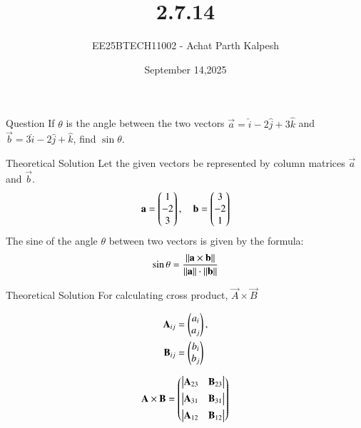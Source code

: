 \documentclass{beamer}
\title %
{2.7.14}
\date{September 14,2025}
\author %
{EE25BTECH11002 - Achat Parth Kalpesh}
\begin{document}
\frame{\titlepage}

\begin{frame}{Question}
If $\theta$ is the angle between the two vectors $\vec{a} = \hat{i} - 2\hat{j} + 3\hat{k}$ and $\vec{b} = 3\hat{i} - 2\hat{j} + \hat{k}$, find $\sin \theta$.
\end{frame}

\begin{frame}{Theoretical Solution}
Let the given vectors be represented by column matrices $\vec{a}$ and $\vec{b}$.
\begin{align}
    \mathbf{a} = \begin{pmatrix}1 \\ -2 \\ 3\end{pmatrix}, \quad \mathbf{b} = \begin{pmatrix}3 \\ -2 \\ 1\end{pmatrix}
\end{align}
The sine of the angle $\theta$ between two vectors is given by the formula:
\begin{align}
    \sin\theta = \frac{\left\lVert\mathbf{a} \times \mathbf{b}\right\rVert}{\left\lVert\mathbf{a}\right\rVert \cdot \left\lVert\mathbf{b}\right\rVert}
\end{align}
\end{frame}

\begin{frame}{Theoretical Solution}
For calculating cross product, $\vec{A} \times \vec{B}$

\begin{align}
  \label{eq:cross3d-submat}
\begin{split}
  \mathbf{A}_{ij} &= \begin{pmatrix}a_i\\a_j\end{pmatrix}, 
  \\
  \mathbf{B}_{ij} &= \begin{pmatrix}b_i\\b_j\end{pmatrix}
\end{split}
\end{align}

\begin{align}
  \label{eq:cross3d}
	\mathbf{A} \times \mathbf{B} 
	 = \begin{pmatrix} \begin{vmatrix}\mathbf{A}_{23} & \mathbf{B}_{23}\end{vmatrix} \\[1ex] \begin{vmatrix}\mathbf{A}_{31} & \mathbf{B}_{31}\end{vmatrix} \\[1ex] \begin{vmatrix}\mathbf{A}_{12}  & \mathbf{B}_{12}\end{vmatrix}\end{pmatrix}
\end{align}

\end{frame}
\end{document}
